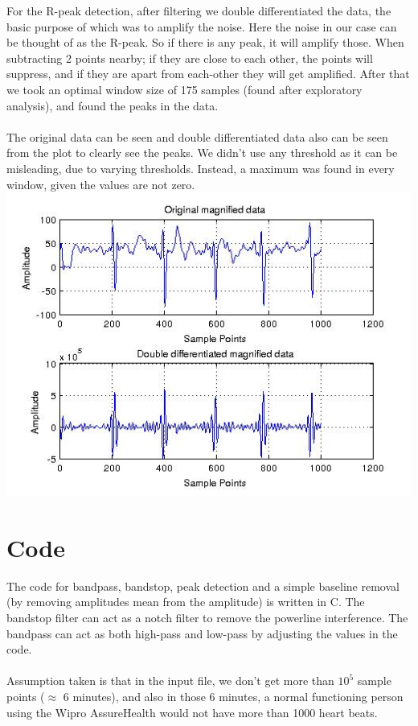 \documentclass{article}
\begin{document}
For the R-peak detection, after filtering we double differentiated the data, the
basic purpose of which was to amplify the noise. Here the noise in our case can
be thought of as the R-peak. So if there is any peak, it will amplify those.
When subtracting 2 points nearby; if they are close to each other, the points
will suppress, and if they are apart from each-other they will get amplified.
After that we took an optimal window size of 175 samples (found after
exploratory analysis), and found the peaks in the data. \\ \\ 
The original data can be seen and double differentiated data also can be seen
from the plot to clearly see the peaks. We didn't use any threshold as it can be 
misleading, due to varying thresholds. Instead, a maximum was found in every
window, given the values are not zero.\\
\includegraphics[width=\textwidth]{doublediff}
\section{Code}
The code for bandpass, bandstop, peak detection and a simple baseline removal 
(by removing amplitudes mean from the amplitude) is written in C. The bandstop filter
can act as a notch filter to remove the powerline interference. The bandpass can act as
both high-pass and low-pass by adjusting the values in the code. \\ \\ 
Assumption taken is that in the input file, we don't get more than $10^5$ sample points
($\approx$ 6 minutes), and also in those 6 minutes, a normal functioning person using the
Wipro AssureHealth would not have more than 1000 heart beats. 
\end{document}
